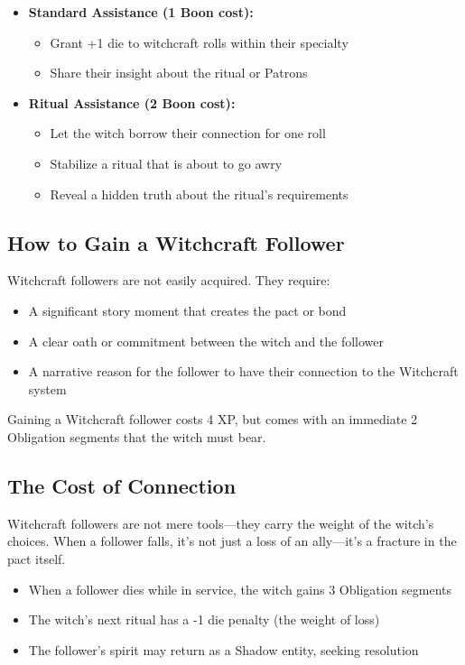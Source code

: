 \begin{itemize}
    \item \textbf{Standard Assistance (1 Boon cost):}
    \begin{itemize}
        \item Grant +1 die to witchcraft rolls within their specialty
        \item Share their insight about the ritual or Patrons
    \end{itemize}
    \item \textbf{Ritual Assistance (2 Boon cost):}
    \begin{itemize}
        \item Let the witch borrow their connection for one roll
        \item Stabilize a ritual that is about to go awry
        \item Reveal a hidden truth about the ritual's requirements
    \end{itemize}
\end{itemize}

\subsection{How to Gain a Witchcraft Follower}

Witchcraft followers are not easily acquired. They require:

\begin{itemize}
    \item A significant story moment that creates the pact or bond
    \item A clear oath or commitment between the witch and the follower
    \item A narrative reason for the follower to have their connection to the Witchcraft system
\end{itemize}

Gaining a Witchcraft follower costs 4 XP, but comes with an immediate 2 Obligation segments that the witch must bear.

\subsection{The Cost of Connection}

Witchcraft followers are not mere tools---they carry the weight of the witch's choices. When a follower falls, it's not just a loss of an ally---it's a fracture in the pact itself.

\begin{itemize}
    \item When a follower dies while in service, the witch gains 3 Obligation segments
    \item The witch's next ritual has a -1 die penalty (the weight of loss)
    \item The follower's spirit may return as a Shadow entity, seeking resolution
\end{itemize}

